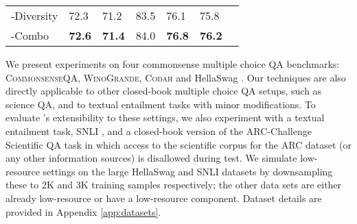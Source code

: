 \documentclass[11pt,a4paper]{article}
\newcommand{\gdaug}{}
\newcommand{\winogrande}{\textsc{WinoGrande}\xspace}
\newcommand{\codah}{\textsc{Codah}\xspace}
\newcommand{\comqa}{\textsc{CommonsenseQA}\xspace}
\newcommand{\roberta}{\textsc{RoBERTa}\xspace}
\begin{document}
\begin{table*}[]
\begin{tabular}{lllllll}
\gdaug-Diversity & 72.3                                                 & 71.2                                                       & 83.5                                                  & 76.1                                                                &75.8                                            \\ 
\gdaug-Combo     & \textbf{72.6}                                                 &\textbf{71.4}                                                       & 84.0                                                  & \textbf{76.8}                                                           &\textbf{76.2}                                               \\ 
\bottomrule
\end{tabular}
\caption{Results on the test sets of four commonsense benchmarks. 
\roberta (reported) is the result for the \roberta-large baseline reported on public leaderboards.\footnotemark \roberta (ours) is re-evaluation of the \roberta-large model using our setup. 
All \gdaug\ methods outperform the baseline methods, and \gdaug-Combo performs the best overall. 
}
\label{test_res}
\end{table*}
  We present experiments on four commonsense multiple choice QA benchmarks: \comqa \cite{talmor-etal-2019-commonsenseqa}, \winogrande \cite{sakaguchi2019winogrande}, \codah \cite{Chen2019CODAHAA} and HellaSwag \cite{zellers2019hellaswag}.  Our techniques are also directly applicable to other closed-book multiple choice QA setups, such as science QA, and to textual entailment tasks with minor modifications.  To evaluate \gdaug 's extensibility to these settings, we also experiment with a textual entailment task, SNLI \cite{bowman2015large},
and a closed-book version of the ARC-Challenge Scientific QA task \cite{Clark2018ThinkYH} in which access to the scientific corpus for the ARC dataset (or any other information sources) is disallowed during test.
We simulate low-resource settings on the large HellaSwag and SNLI datasets by downsampling these to 2K and 3K training samples respectively; the other data sets are either already low-resource or have a low-resource component. 
Dataset details are provided in Appendix \ref{app:datasets}. 
\end{document}
